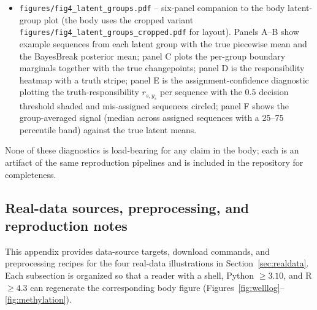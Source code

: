 \begin{itemize}
synthetic Gaussian sequence under three structured deletion patterns (random, contiguous-block,
and periodic). The left column overlays observed and held-out points with the BayesBreak fit;
the right column reports the boundary marginals from the full-data run alongside the
weighted-likelihood run that down-weights deleted positions, showing that the recovered
changepoint posterior is robust to all three patterns while contiguous-block missingness
introduces the largest boundary-mass shift, as expected when an entire segment is removed from
the observation window.
\item \texttt{figures/fig4\_latent\_groups.pdf} -- six-panel companion to the body latent-group
plot (the body uses the cropped variant \texttt{figures/fig4\_latent\_groups\_cropped.pdf} for
layout). Panels A--B show example sequences from each latent group with the true piecewise mean
and the BayesBreak posterior mean; panel C plots the per-group boundary marginals together with
the true changepoints; panel D is the responsibility heatmap with a truth stripe; panel E is the
assignment-confidence diagnostic plotting the truth-responsibility $r_{s,y_s}$ per sequence with
the $0.5$ decision threshold shaded and mis-assigned sequences circled; panel F shows the
group-averaged signal (median across assigned sequences with a 25--75 percentile band) against
the true latent means.
\end{itemize}
None of these diagnostics is load-bearing for any claim in the body; each is an artifact of the
same reproduction pipelines and is included in the repository for completeness.

\subsection{Real-data sources, preprocessing, and reproduction notes}
\label{app:real-data}

This appendix provides data-source targets, download commands, and preprocessing recipes for the
four real-data illustrations in Section~\ref{sec:realdata}. Each subsection is organized so that a
reader with a shell, Python $\ge 3.10$, and R $\ge 4.3$ can regenerate the corresponding body
figure (Figures~\ref{fig:welllog}--\ref{fig:methylation}).

